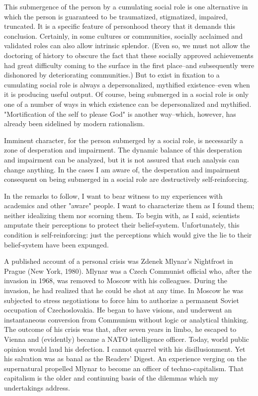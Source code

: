 This submergence of the person by a cumulating social role is one alternative in which the person is guaranteed to be traumatized, stigmatized, impaired, truncated. It is a specific feature of personhood theory that it demands this conclusion. Certainly, in some cultures or communities, socially acclaimed and validated roles can also allow intrinsic splendor. (Even so, we must not allow the doctoring of history to obscure the fact that these socially approved achievements had great difficulty coming to the surface in the first place--and subsequently were dishonored by deteriorating communities.) But to exist in fixation to a cumulating social role is always a depersonalized, mythified existence--even when it is producing useful output. Of course, being submerged in a social role is only one of a number of ways in which existence can be depersonalized and mythified. "Mortification of the self to please God" is another way--which, however, has already been sidelined by modern rationalism.

Imminent character, for the person submerged by a social role, is necessarily a zone of desperation and impairment. The dynamic balance of this desperation and impairment can be analyzed, but it is not assured that such analysis can change anything. In the cases I am aware of, the desperation and impairment consequent on being submerged in a social role are destructively self-reinforcing.

In the remarks to follow, I want to bear witness to my experiences with academics and other "aware" people. I want to characterize them as I found them; neither idealizing them nor scorning them. To begin with, as I said, scientists amputate their perceptions to protect their belief-system. Unfortunately, this condition is self-reinforcing: just the perceptions which would give the lie to their belief-system have been expunged.

A published account of a personal crisis was Zdenek Mlynar's Nightfrost in Prague (New York, 1980). Mlynar was a Czech Communist official who, after the invasion in 1968, was removed to Moscow with his colleagues. During the invasion, he had realized that he could be shot at any time. In Moscow he was subjected to stress negotiations to force him to authorize a permanent Soviet occupation of Czechoslovakia. He began to have visions, and underwent an instantaneous conversion from Communism without logic or analytical thinking. The outcome of his crisis was that, after seven years in limbo, he escaped to Vienna and (evidently) became a NATO intelligence officer. Today, world public opinion would laud his defection. I cannot quarrel with his disillusionment. Yet his salvation was as banal as the Readers' Digest. An experience verging on the supernatural propelled Mlynar to become an officer of techno-capitalism. That capitalism is the older and continuing basis of the dilemmas which my undertakings address.

